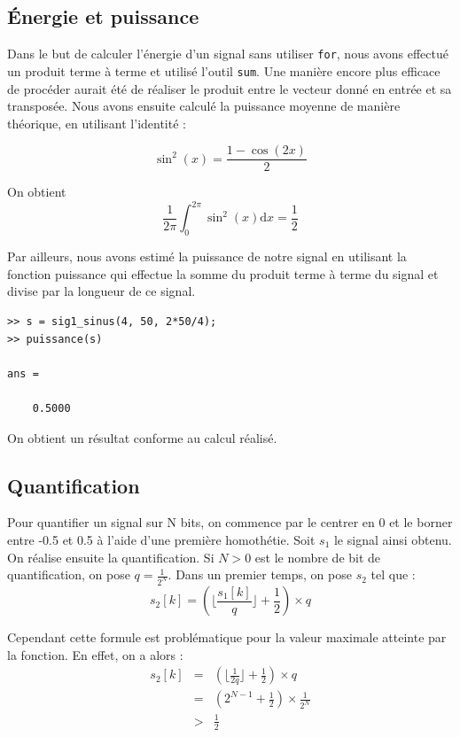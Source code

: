 \documentclass[french]{article}
\begin{document}
\subsection{ Énergie et puissance}

Dans le but de calculer l'énergie d'un signal sans utiliser \verb`for`, nous avons effectué un produit terme à terme et utilisé l'outil \verb`sum`. Une manière encore plus efficace de procéder aurait été de réaliser le produit entre le vecteur donné en entrée et sa transposée. Nous avons ensuite calculé la puissance moyenne de manière théorique, en utilisant l'identité :

\begin{equation}
\sin^2(x)=\frac {1-\cos(2x)} {2}
\end{equation}

On obtient
\begin{equation}
\frac{1} {2 \pi} \int_{0}^{2 \pi} \sin^2(x) \mathrm{d}x = \frac{1}{2}
\end{equation}

Par ailleurs, nous avons estimé la puissance de notre signal en utilisant la fonction puissance qui effectue la somme du produit terme à terme du signal et divise par la longueur de ce signal.

\lstset{language=matlab}
\begin{lstlisting}
>> s = sig1_sinus(4, 50, 2*50/4);
>> puissance(s)

ans =

    0.5000
\end{lstlisting}

On obtient un résultat conforme au calcul réalisé.

\subsection{ Quantification}

Pour quantifier un signal sur N bits, on commence par le centrer en 0 et le borner entre -0.5 et 0.5 à l'aide d'une première homothétie. Soit $s_1$ le signal ainsi obtenu. On réalise ensuite la quantification. Si $N > 0$ est le nombre de bit de quantification, on pose $q=\frac{1}{2^N}$. Dans un premier temps, on pose $s_2$ tel que :
\begin{equation}
  s_2[k] = (\lfloor \frac{s_1[k]}{q} \rfloor + \frac{1}{2}) \times q
\end{equation}

Cependant cette formule est problématique pour la valeur maximale atteinte par la fonction. En effet, on a alors :
\begin{eqnarray}
s_2[k] &=& \left( \lfloor \frac{1}{2q} \rfloor + \frac{1}{2}\right) \times q \\
&=& \left(2^{N-1} + \frac{1}{2}\right) \times \frac{1}{2^N} \\
&>& \frac{1}{2}
\end{eqnarray}
\end{document}

